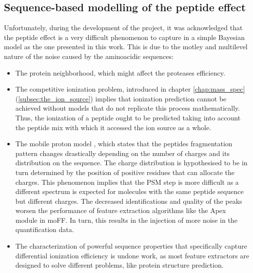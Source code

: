 \subsection{Sequence-based modelling of the peptide effect}

Unfortunately, during the development of the project, it was acknowledged that the peptide effect is a very difficult phenomenon to capture in a simple Bayesian model as the one presented in this work. This is due to the motley and multilevel nature of the noise caused by the aminoacidic sequences:

\begin{itemize}

\item The protein neighborhood, which might affect the protease\textquotesingle s efficiency.

\item The competitive ionization problem, introduced in chapter \ref{chap:mass_spec} (\ref{subsec:the_ion_source}) implies that ionization prediction cannot be achieved without models that do not replicate this process mathematically. Thus, the ionization of a peptide ought to be predicted taking into account the peptide mix with which it accessed the ion source as a whole.


\item The mobile proton model \cite{Boyd2010}, which states that the peptide\textquotesingle s fragmentation pattern changes drastically depending on the number of charges and its distribution on the sequence. The charge distribution is hypothesised to be in turn determined by the position of positive residues that can allocate the charges. This phenomenon implies that the \ac{PSM} step is more difficult as a different spectrum is expected for molecules with the same peptide sequence but different charges. The decreased identifications and quality of the peaks worsen the performance of feature extraction algorithms like the Apex module in moFF. In turn, this results in the injection of more noise in the quantification data.

\item The characterization of powerful sequence properties that specifically capture differential ionization efficiency is undone work, as most feature extractors are designed to solve different problems, like protein structure prediction.

\end{itemize}


